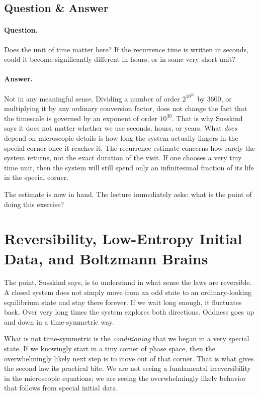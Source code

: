 \subsection{Question \& Answer}

\paragraph{Question.} Does the unit of time matter here? If the recurrence time is written in seconds, could it become significantly different in hours, or in some very short unit?

\paragraph{Answer.} Not in any meaningful sense. Dividing a number of order \(2^{10^{30}}\) by \(3600\), or multiplying it by any ordinary conversion factor, does not change the fact that the timescale is governed by an exponent of order \(10^{30}\). That is why Susskind says it does not matter whether we use seconds, hours, or years. What \emph{does} depend on microscopic details is how long the system actually lingers in the special corner once it reaches it. The recurrence estimate concerns how rarely the system returns, not the exact duration of the visit. If one chooses a very tiny time unit, then the system will still spend only an infinitesimal fraction of its life in the special corner.

The estimate is now in hand. The lecture immediately asks: what is the point of doing this exercise?

\section{Reversibility, Low-Entropy Initial Data, and Boltzmann Brains}

The point, Susskind says, is to understand in what sense the laws are reversible. A closed system does not simply move from an odd state to an ordinary-looking equilibrium state and stay there forever. If we wait long enough, it fluctuates back. Over very long times the system explores both directions. Oddness goes up and down in a time-symmetric way.

What is not time-symmetric is the \emph{conditioning} that we began in a very special state. If we knowingly start in a tiny corner of phase space, then the overwhelmingly likely next step is to move out of that corner. That is what gives the second law its practical bite. We are not seeing a fundamental irreversibility in the microscopic equations; we are seeing the overwhelmingly likely behavior that follows from special initial data.

